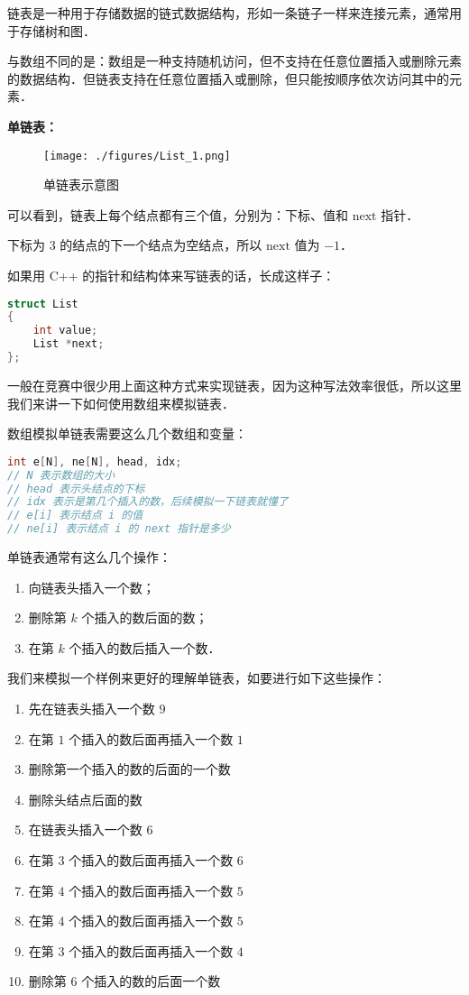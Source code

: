 
链表是一种用于存储数据的链式数据结构，形如一条链子一样来连接元素，通常用于存储树和图．

与数组不同的是：数组是一种支持随机访问，但不支持在任意位置插入或删除元素的数据结构．但链表支持在任意位置插入或删除，但只能按顺序依次访问其中的元素．

\textbf{单链表：}

\begin{figure}[ht]
\centering
\texttt{[image: ./figures/List\_1.png]}
\caption{单链表示意图} \label{List_fig1}
\end{figure}

可以看到，链表上每个结点都有三个值，分别为：下标、值和 $\text{next}$ 指针．

下标为 $3$ 的结点的下一个结点为空结点，所以 $\text{next}$ 值为 $-1$．

如果用 C++ 的指针和结构体来写链表的话，长成这样子：
\begin{lstlisting}[language=cpp]
struct List
{
    int value;
    List *next;
};
\end{lstlisting}

一般在竞赛中很少用上面这种方式来实现链表，因为这种写法效率很低，所以这里我们来讲一下如何使用数组来模拟链表．

数组模拟单链表需要这么几个数组和变量：
\begin{lstlisting}[language=cpp]
int e[N], ne[N], head, idx;
// N 表示数组的大小
// head 表示头结点的下标
// idx 表示是第几个插入的数，后续模拟一下链表就懂了
// e[i] 表示结点 i 的值
// ne[i] 表示结点 i 的 next 指针是多少
\end{lstlisting}

单链表通常有这么几个操作：
\begin{enumerate}
\item 向链表头插入一个数；
\item 删除第 $k$ 个插入的数后面的数；
\item 在第 $k$ 个插入的数后插入一个数．
\end{enumerate}

我们来模拟一个样例来更好的理解单链表，如要进行如下这些操作：

\begin{enumerate}
\item 先在链表头插入一个数 $9$
\item 在第 $1$ 个插入的数后面再插入一个数 $1$
\item 删除第一个插入的数的后面的一个数
\item 删除头结点后面的数
\item 在链表头插入一个数 $6$
\item 在第 $3$ 个插入的数后面再插入一个数 $6$
\item 在第 $4$ 个插入的数后面再插入一个数 $5$
\item 在第 $4$ 个插入的数后面再插入一个数 $5$
\item 在第 $3$ 个插入的数后面再插入一个数 $4$
\item 删除第 $6$ 个插入的数的后面一个数
\end{enumerate}

